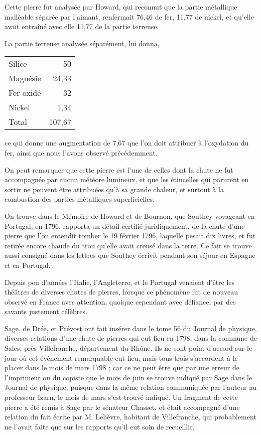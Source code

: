 \documentclass[a4paper, 12pt, oneside, french]{article}
\begin{document}
Cette pierre fut analysée par Howard, qui reconnut que la partie métallique malléable séparée par l'aimant, renfermait 76,46 de fer, 11,77 de nickel, et qu'elle avait entraîné avec elle 11,77 de la partie terreuse.

La partie terreuse analysée séparément, lui donna,
\begin{table}[H]
    \centering
    \begin{tabular}{l r}
        Silice & 50 \\
        Magnésie & 24,33 \\
        Fer oxidé & 32 \\
        Nickel & 1,34 \\ \hline
        Total & 107,67 \\
    \end{tabular}
\end{table}
ce qui donne une augmentation de 7,67 que l'on doit attribuer à l'oxydation du fer, ainsi que nous l'avons observé précédemment.

On peut remarquer que cette pierre est l'une de celles dont la chute ne fut accompagnée par aucun météore lumineux, et que les étincelles qui parurent en sortir ne peuvent être attribuées qu'à sa grande chaleur, et surtout à la combustion des parties métalliques superficielles.

On trouve dans le Mémoire de Howard et de Bournon, que Southey voyageant en Portugal, en 1796, rapporta un détail certifié juridiquement, de la chute d'une pierre que l'on entendit tomber le 19 février 1796, laquelle pesait dix livres, et fut retirée encore chaude du trou qu'elle avait creusé dans la terre. Ce fait se trouve aussi consigné dans les lettres que Southey écrivit pendant son séjour en Espagne et en Portugal.

Depuis peu d'années l'Italie, l'Angleterre, et le Portugal venaient d'être les théâtres de diverses chutes de pierres, lorsque ce phénomène fut de nouveau observé en France avec attention, quoique cependant avec défiance, par des savants justement célèbres.

Sage, de Drée, et Prévost ont fait insérer dans le tome 56 du Journal de physique, diverses relations d'une chute de pierres qui eut lieu en 1798, dans la commune de Sales, près Villefranche, département du Rhône. Ils ne sont point d'accord sur le jour où cet évènement remarquable eut lieu, mais tous trois s'accordent à le placer dans le mois de mars 1798 ; car ce ne peut être que par une erreur de l'imprimeur ou du copiste que le mois de juin se trouve indiqué par Sage dans le Journal de physique, puisque dans la même relation communiquée par l'auteur au professeur Izarn, le mois de mars s'est trouvé indiqué. Un fragment de cette pierre a été remis à Sage par le sénateur Chasset, et était accompagné d'une relation du fait écrite par M. Lelièvre, habitant de Villefranche, qui probablement ne l'avait faite que sur les rapports qu'il eut soin de recueillir.
\end{document}
